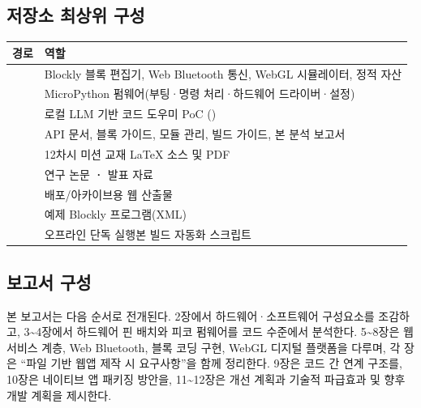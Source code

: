 \subsection{저장소 최상위 구성}

\begin{longtable}{L{3.2cm} L{11.3cm}}
\toprule
{}\textbf{경로} & \textbf{역할} \\
\midrule
\endhead
{} & Blockly 블록 편집기, Web Bluetooth 통신, WebGL 시뮬레이터, 정적 자산 \\
 & MicroPython 펌웨어(부팅·명령 처리·하드웨어 드라이버·설정) \\
 & 로컬 LLM 기반 코드 도우미 PoC () \\
 & API 문서, 블록 가이드, 모듈 관리, 빌드 가이드, 본 분석 보고서 \\
 & 12차시 미션 교재 LaTeX 소스 및 PDF \\
 & 연구 논문 \textbf{·} 발표 자료 \\
 & 배포/아카이브용 웹 산출물 \\
 & 예제 Blockly 프로그램(XML) \\
 & 오프라인 단독 실행본 빌드 자동화 스크립트 \\
\bottomrule
\end{longtable}

\subsection{보고서 구성}

본 보고서는 다음 순서로 전개된다. 2장에서 하드웨어·소프트웨어 구성요소를
조감하고, 3\textasciitilde 4장에서 하드웨어 핀 배치와 피코 펌웨어를 코드
수준에서 분석한다. 5\textasciitilde 8장은 웹 서비스 계층, Web Bluetooth,
블록 코딩 구현, WebGL 디지털 플랫폼을 다루며, 각 장은 ``파일 기반 웹앱
제작 시 요구사항''을 함께 정리한다. 9장은 코드 간 연계 구조를, 10장은
네이티브 앱 패키징 방안을, 11\textasciitilde 12장은 개선 계획과 기술적
파급효과 및 향후 개발 계획을 제시한다.

